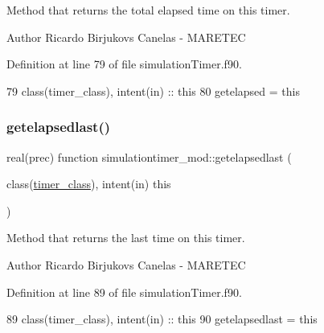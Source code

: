 Method that returns the total elapsed time on this timer. 

\begin{DoxyAuthor}{Author}
Ricardo Birjukovs Canelas -\/ M\+A\+R\+E\+T\+EC 
\end{DoxyAuthor}


Definition at line 79 of file simulation\+Timer.\+f90.


\begin{DoxyCode}
79     \textcolor{keywordtype}{class}(timer\_class), \textcolor{keywordtype}{intent(in)} :: this
80     getelapsed = this%
\end{DoxyCode}
\mbox{\label{namespacesimulationtimer__mod_a70cb936bfcb2754fa6f1fbe3e7a715a5}} 
\subsubsection{\texorpdfstring{getelapsedlast()}{getelapsedlast()}}
{\footnotesize\ttfamily real(prec) function simulationtimer\+\_\+mod\+::getelapsedlast (\begin{DoxyParamCaption}\item[{class(\mbox{\hyperlink{structsimulationtimer__mod_1_1timer__class}{timer\+\_\+class}}), intent(in)}]{this }\end{DoxyParamCaption})\hspace{0.3cm}{\ttfamily [private]}}



Method that returns the last time on this timer. 

\begin{DoxyAuthor}{Author}
Ricardo Birjukovs Canelas -\/ M\+A\+R\+E\+T\+EC 
\end{DoxyAuthor}


Definition at line 89 of file simulation\+Timer.\+f90.


\begin{DoxyCode}
89     \textcolor{keywordtype}{class}(timer\_class), \textcolor{keywordtype}{intent(in)} :: this
90     getelapsedlast = this%
\end{DoxyCode}
\mbox{\label{namespacesimulationtimer__mod_a3e4c0de31b2db7da6c0c781c047a3743}} 
